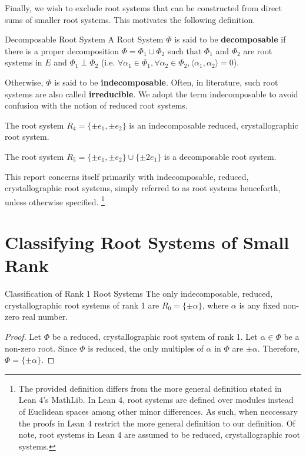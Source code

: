 Finally, we wish to exclude root systems that can be constructed from direct sums of smaller root systems.
This motivates the following definition. \newline

\begin{nameddefinition}{Decomposable Root System}
    A Root System $\Phi$ is said to be \textbf{decomposable} if there is a proper decomposition
    $\Phi = \Phi_1 \cup \Phi_2$ such that $\Phi_1$ and $\Phi_2$ are root systems in $E$ and $\Phi_1 \perp \Phi_2$ (i.e. 
    $\forall \alpha_1 \in \Phi_1 , \forall \alpha_2 \in \Phi_2,  \langle \alpha_1, \alpha_2 \rangle = 0$). \newline 

    Otherwise, $\Phi$ is said to be \textbf{indecomposable}. 
    Often, in literature, such root systems are also called \textbf{irreducible}.
    We adopt the term indecomposable to avoid confusion with the notion of reduced root systems.
\end{nameddefinition}

\begin{example}
    The root system $R_4 = \{ \pm e_1, \pm e_2 \}$ is an indecomposable reduced, crystallographic root system.
\end{example}

\begin{example}
    The root system $R_5 = \{ \pm e_1, \pm e_2 \} \cup \{ \pm 2 e_1 \}$ is a decomposable root system.
\end{example}

This report concerns itself primarily with indecomposable, reduced, crystallographic root systems, simply referred to as root systems henceforth, unless otherwise specified.
\footnote{
    The provided definition differs from the more general definition stated in Lean 4's MathLib.
    In Lean 4, root systems are defined over modules instead of Euclidean spaces among other minor differences.
    As such, when neccessary the proofs in Lean 4 restrict the more general definition to our definition.
    Of note, root systems in Lean 4 are assumed to be reduced, crystallographic root systems.} \newline

\section{Classifying Root Systems of Small Rank}

\begin{namedtheorem}{Classification of Rank 1 Root Systems}
    The only indecomposable, reduced, crystallographic root systems of rank 1 are $R_0 = \{ \pm \alpha \}$, where $\alpha$ is any fixed non-zero real number.
\end{namedtheorem}

\begin{proof}
    Let $\Phi$ be a reduced, crystallographic root system of rank 1.
    Let $\alpha \in \Phi$ be a non-zero root.
    Since $\Phi$ is reduced, the only multiples of $\alpha$ in $\Phi$ are $\pm \alpha$.
    Therefore, $\Phi = \{ \pm \alpha \}$.
\end{proof}

